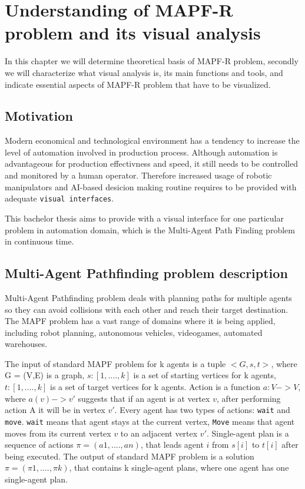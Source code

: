\documentclass[thesis=B,english]{FITthesis}[2019/12/23]
\begin{document}
\chapter{Understanding of MAPF-R problem and its visual analysis}

In this chapter we will determine theoretical basis of MAPF-R problem,
secondly we will characterize what visual analysis is, its main functions and tools,
and indicate essential aspects of MAPF-R problem that have to be visualized.


\section{Motivation}

Modern economical and technological environment has a tendency to increase the level of automation involved in production process. Although automation is advantageous for production effectivness and speed, it still needs to be controlled and monitored by a human operator. Therefore increased usage of robotic manipulators and AI-based desicion making routine requires to be provided with adequate \verb|visual interfaces|.

This bachelor thesis aims to provide with a visual interface for one particular problem in automation domain, which is the Multi-Agent Path Finding problem in continuous time.

\section{Multi-Agent Pathfinding problem description}

Multi-Agent Pathfinding problem deals with planning paths for multiple agents
so they can avoid collisions with each other and reach their target destination.
The MAPF problem has a vast range of domains where it is being applied, including robot planning, autonomous vehicles, videogames, automated warehouses. 

The input of standard MAPF problem for k agents is a tuple $<G,s,t>$, where G = (V,E) is a graph, $s:[1,....,k]$ is a set of starting vertices for k agents, $t:[1,....,k]$ is a set of target vertices for k agents. Action is a function $a:V->V$, where $a(v)->v'$ suggests
that if an agent is at vertex $v$, after performing action A it will be in vertex $v'$.
Every agent has two types of actions: \verb|wait| and \verb|move|. \verb|wait| means that agent stays at the current vertex, \verb|Move| means that agent moves from its current vertex $v$ to an adjacent vertex $v'$. Single-agent plan is a sequence of actions $\pi = (a1,....,an)$, that leads agent $i$ from $s[i]$ to $t[i]$ after being executed. The output of standard MAPF problem is a solution $\pi = (\pi 1,...., \pi k)$, that contains k single-agent plans, where one agent has one single-agent plan.
\end{document}
